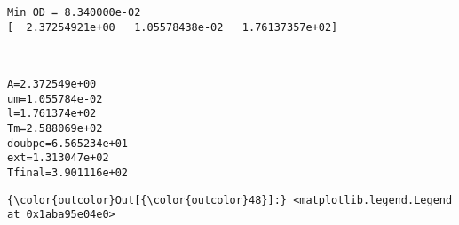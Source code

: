 \documentclass[11pt]{article}
\begin{document}
    \begin{Verbatim}[commandchars=\\\{\}]
Min OD = 8.340000e-02
[  2.37254921e+00   1.05578438e-02   1.76137357e+02]

    \end{Verbatim}

    \begin{center}
    \end{center}
    { \hspace*{\fill} \\}
    
    \begin{Verbatim}[commandchars=\\\{\}]
A=2.372549e+00
um=1.055784e-02
l=1.761374e+02
Tm=2.588069e+02
doubpe=6.565234e+01
ext=1.313047e+02
Tfinal=3.901116e+02

    \end{Verbatim}

            \begin{Verbatim}[commandchars=\\\{\}]
{\color{outcolor}Out[{\color{outcolor}48}]:} <matplotlib.legend.Legend at 0x1aba95e04e0>
\end{Verbatim}
        
    \begin{center}
    \end{center}
    { \hspace*{\fill} \\}
    
    \begin{center}
    \end{center}
    { \hspace*{\fill} \\}
    
\end{document}
